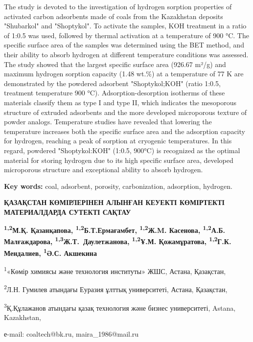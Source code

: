 The study is devoted to the investigation of hydrogen sorption
properties of activated carbon adsorbents made of coals from the
Kazakhstan deposits "Shubarkol" and "Shoptykol". To activate the
samples, KOH treatment in a ratio of 1:0.5 was used, followed by thermal
activation at a temperature of 900 °C. The specific surface area of
\hspace{0pt}\hspace{0pt}the samples was determined using the BET method,
and their ability to absorb hydrogen at different temperature conditions
was assessed. The study showed that the largest specific surface area
(926.67 m²/g) and maximum hydrogen sorption capacity (1.48 wt.\%) at a
temperature of 77 K are demonstrated by the powdered adsorbent
"Shoptykol;KOH" (ratio 1:0.5, treatment temperature 900 °C).
Adsorption-desorption isotherms of these materials classify them as type
I and type II, which indicates the mesoporous structure of extruded
adsorbents and the more developed microporous texture of powder analogs.
Temperature studies have revealed that lowering the temperature
increases both the specific surface area and the adsorption capacity for
hydrogen, reaching a peak of sorption at cryogenic temperatures. In this
regard, powdered "Shoptykol:KOH" (1:0.5, 900°C) is recognized as the
optimal material for storing hydrogen due to its high specific surface
area, developed microporous structure and exceptional ability to absorb
hydrogen.

{\bfseries Key words:} coal, adsorbent, porosity, carbonization,
adsorption, hydrogen.

\begin{articleheader}
{\bfseries ҚАЗАҚСТАН КӨМІРЛЕРІНЕН АЛЫНҒАН КЕУЕКТІ КӨМІРТЕКТІ МАТЕРИАЛДАРДА СУТЕКТІ САҚТАУ}

{\bfseries
\textsuperscript{1,2}М.Қ. Қазанқапова\textsuperscript{\envelope },
\textsuperscript{1,2}Б.Т.Ермағамбет,
\textsuperscript{1,2}Ж.M. Касенова,
\textsuperscript{1,2}А.Б. Малғаждарова,
\textsuperscript{1,3}Ж.Т.~Даулетжанова,
\textsuperscript{1,2}Ұ.М. Қожамұратова,
\textsuperscript{1,2}Г.К. Мендалиев,
\textsuperscript{1}Ә.С. Акшекина
}
\end{articleheader}

\begin{affiliation}
\textsuperscript{1}«Көмір химиясы және технология институты» ЖШС, Астана, Қазақстан,

\textsuperscript{2}Л.Н. Гумилев атындағы Еуразия ұлттық университеті, Астана, Қазақстан,

\textsuperscript{3}Қ.Құлажанов атындағы қазақ технология және бизнес университеті, Astana, Kazakhstan,

е-mail: coaltech@bk.ru, maira\_1986@mail.ru
\end{affiliation}


